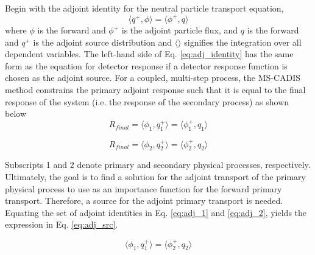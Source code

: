 Begin with the adjoint identity for the neutral particle transport
equation, 
 \begin{equation}\label{eq:adj_identity}
		\langle q^{+}, \phi \rangle =
		\langle \phi^{+}, q \rangle
 \end{equation}
where $\phi$ is the forward and 
$\phi^{+}$ is the adjoint particle flux, and
$q$ is the forward and 
$q^{+}$ is the adjoint source distribution and $\langle \rangle$ signifies the
integration over all dependent variables.
The left-hand side of Eq. \ref{eq:adj_identity} has the same form as the
equation for detector response
if a detector response function is chosen as the adjoint source.
For a coupled, multi-step process, the MS-CADIS method 
constrains the primary adjoint response such that it is equal to  
the final response of the system (i.e. the response of the secondary process) as shown below
 \begin{equation}\label{eq:adj_1}
	 R_{final} = \langle \phi_{1}, q_{1}^{+} \rangle =
		\langle \phi_{1}^{+} , q_{1} \rangle
 \end{equation}

	 
 \begin{equation}\label{eq:adj_2}
	 R_{final} = \langle \phi_{2}, q_{2}^{+} \rangle =
		\langle \phi_{2}^{+} , q_{2} \rangle
 \end{equation}
 

Subscripts 1 and 2 denote primary and secondary physical processes,
respectively.  Ultimately, the goal is to find a solution for the adjoint
transport of the primary physical process to use as an importance
function for the forward primary transport. Therefore, a
source for the adjoint primary transport is needed.  Equating the set of adjoint
identities in Eq. \ref{eq:adj_1} and \ref{eq:adj_2}, yields the expression in Eq.
\ref{eq:adj_src}.

 \begin{equation}\label{eq:adj_src}
	 \langle \phi_{1}, q_{1}^{+} \rangle =
	 \langle \phi_{2}^{+}, q_{2} \rangle
 \end{equation}

